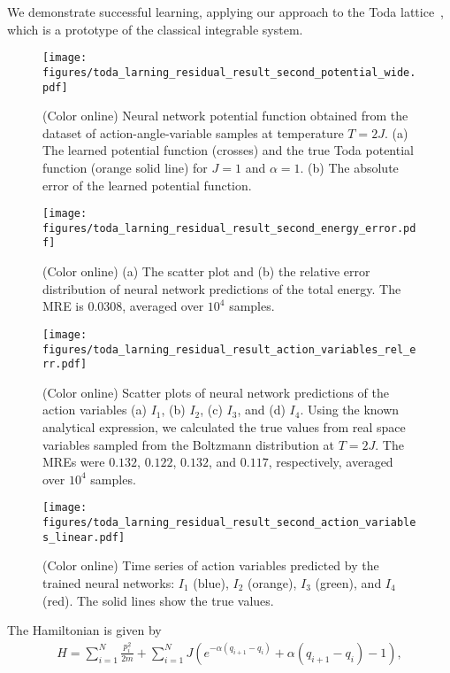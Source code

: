 
We demonstrate successful learning, applying our approach to the Toda lattice~\cite{Toda1967-2,Toda1967}, which is a prototype of the classical integrable system.
\begin{figure}[tp]
  \centering
  \texttt{[image: figures/toda\_larning\_residual\_result\_second\_potential\_wide.pdf]}
  \caption{
    (Color online) Neural network potential function obtained from the dataset of action-angle-variable samples at temperature $T=2J$.
    (a) The learned potential function (crosses) and the true Toda potential function (orange solid line) for $J = 1$ and $\alpha = 1$.
    (b) The absolute error of the learned potential function.
    }
\label{fig:toda_larning_residual_result_second_potential}
\end{figure}
\begin{figure}[tp]
  \centering
  \texttt{[image: figures/toda\_larning\_residual\_result\_second\_energy\_error.pdf]}
  \caption{
    (Color online) (a) The scatter plot and (b) the relative error distribution of neural network predictions of the total energy.
    The MRE is 0.0308, averaged over $10^4$ samples.
    }
\label{fig:toda_larning_residual_result_second_energy_error}
\end{figure}
\begin{figure}[tp]
  \centering
  \texttt{[image: figures/toda\_larning\_residual\_result\_action\_variables\_rel\_err.pdf]}
  \caption{
    (Color online) Scatter plots of neural network predictions of the action variables (a) $I_1$, (b) $I_2$, (c) $I_3$, and (d) $I_4$.
    Using the known analytical expression, we calculated the true values from real space variables sampled from the Boltzmann distribution at $T=2J$.
    The MREs were $0.132$, $0.122$, $0.132$, and $0.117$, respectively, averaged over $10^4$ samples.
    }
\label{fig:toda_larning_residual_result_action_variables_rel_err}
\end{figure}
\begin{figure}[tp]
  \centering
  \texttt{[image: figures/toda\_larning\_residual\_result\_second\_action\_variables\_linear.pdf]}
  \caption{
      (Color online) Time series of action variables predicted by the trained neural networks: $I_1$ (blue), $I_2$ (orange), $I_3$ (green), and $I_4$ (red). The solid lines show the true values.
    }
\label{fig:toda_larning_residual_result_second_action_variables}
\end{figure}
The Hamiltonian is given by
\begin{align}
 H = \sum_{i=1}^{N} \frac{p_i^2}{2m} + \sum_{i=1}^N J\left(e^{-\alpha(q_{i+1} - q_{i})} + \alpha (q_{i+1} - q_{i}) - 1 \right), \label{eq:toda_hamiltonian}
\end{align}
